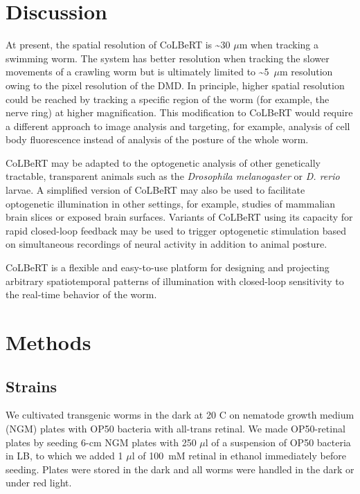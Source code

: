 \section{Discussion}
At present, the spatial resolution of CoLBeRT is \textasciitilde{30} $\mu$m when tracking a swimming worm. The system has better resolution when tracking the slower movements of a crawling worm but is ultimately limited to \textasciitilde5~$\mu$m resolution owing to the pixel resolution of the DMD. In principle, higher spatial resolution could be reached by tracking a specific region of the worm (for example, the nerve ring) at higher magnification. This modification to CoLBeRT would require a different approach to image analysis and targeting, for example, analysis of cell body fluorescence instead of analysis of the posture of the whole worm.

CoLBeRT may be adapted to the opto\-gen\-etic analysis of other genetic\-ally tract\-able, trans\-parent animals such as the \textit{Drosophila melanogaster} or \textit{D. rerio} larvae. A simplified version of CoLBeRT may also be used to facilitate optogenetic illumination in other settings, for example, studies of mammalian brain slices or exposed brain surfaces. Variants of CoLBeRT using its capacity for rapid closed-loop feedback may be used to trigger optogenetic stimulation based on simultaneous recordings of neural activity in addition to animal posture.

CoLBeRT is a flexible and easy-to-use platform for designing and projecting arbitrary spatiotemporal patterns of illumination with closed-loop sensitivity to the real-time behavior of the worm.

\section{Methods}
\subsection{Strains}
We cultivated transgenic worms in the dark at 20 \textdegree C on nematode growth medium (NGM) plates with OP50 bacteria with all-trans retinal. We made OP50-retinal plates by seeding 6-cm NGM plates with 250 $\mu$l of a suspension of OP50 bacteria in LB, to which we added 1 $\mu$l of 100~mM retinal in ethanol immediately before seeding. Plates were stored in the dark and all worms were handled in the dark or under red light.


